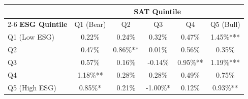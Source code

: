 \begin{tabular}{lccccc}
\toprule
& \multicolumn{5}{c}{\textbf{SAT Quintile}} \\
\cmidrule(lr){2-6}
\textbf{ESG Quintile} & Q1 (Bear) & Q2 & Q3 & Q4 & Q5 (Bull) \\
\midrule
Q1 (Low ESG) & 0.22\% & 0.24\% & 0.32\% & 0.47\% & 1.45\%*** \\
Q2 & 0.47\% & 0.86\%** & 0.01\% & 0.56\% & 0.35\% \\
Q3 & 0.57\% & 0.16\% & -0.14\% & 0.95\%** & 1.19\%*** \\
Q4 & 1.18\%** & 0.28\% & 0.28\% & 0.49\% & 0.75\% \\
Q5 (High ESG) & 0.85\%* & 0.21\% & -1.00\%* & 0.12\% & 0.93\%** \\
\bottomrule
\end{tabular}
